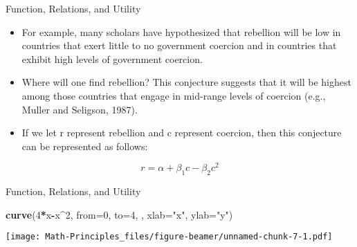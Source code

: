 \documentclass[
  ignorenonframetext,
]{beamer}
\newenvironment{Shaded}{\begin{snugshade}}{\end{snugshade}}
\newcommand{\DataTypeTok}[1]{\textcolor[rgb]{0.13,0.29,0.53}{#1}}
\newcommand{\DecValTok}[1]{\textcolor[rgb]{0.00,0.00,0.81}{#1}}
\newcommand{\KeywordTok}[1]{\textcolor[rgb]{0.13,0.29,0.53}{\textbf{#1}}}
\newcommand{\NormalTok}[1]{#1}
\newcommand{\OperatorTok}[1]{\textcolor[rgb]{0.81,0.36,0.00}{\textbf{#1}}}
\newcommand{\StringTok}[1]{\textcolor[rgb]{0.31,0.60,0.02}{#1}}
\begin{document}
\begin{frame}{Function, Relations, and Utility}
\protect\hypertarget{function-relations-and-utility-17}{}

\begin{itemize}
\item
  For example, many scholars have hypothesized that rebellion will be
  low in countries that exert little to no government coercion and in
  countries that exhibit high levels of government coercion.
\item
  Where will one find rebellion? This conjecture suggests that it will
  be highest among those countries that engage in mid-range levels of
  coercion (e.g., Muller and Seligson, 1987).
\item
  If we let r represent rebellion and c represent coercion, then this
  conjecture can be represented as follows:
\end{itemize}

\[r=\alpha+β_{1}c−β_{2}c^{2}\]

\end{frame}

\begin{frame}[fragile]{Function, Relations, and Utility}
\protect\hypertarget{function-relations-and-utility-18}{}

\begin{Shaded}
\begin{Highlighting}[]
\KeywordTok{curve}\NormalTok{(}\DecValTok{4}\OperatorTok{*}\NormalTok{x}\OperatorTok{-}\NormalTok{x}\OperatorTok{^}\DecValTok{2}\NormalTok{, }\DataTypeTok{from=}\DecValTok{0}\NormalTok{, }\DataTypeTok{to=}\DecValTok{4}\NormalTok{, , }\DataTypeTok{xlab=}\StringTok{"x"}\NormalTok{, }\DataTypeTok{ylab=}\StringTok{"y"}\NormalTok{)}
\end{Highlighting}
\end{Shaded}

\texttt{[image: Math-Principles\_files/figure-beamer/unnamed-chunk-7-1.pdf]}

\end{frame}
\end{document}
